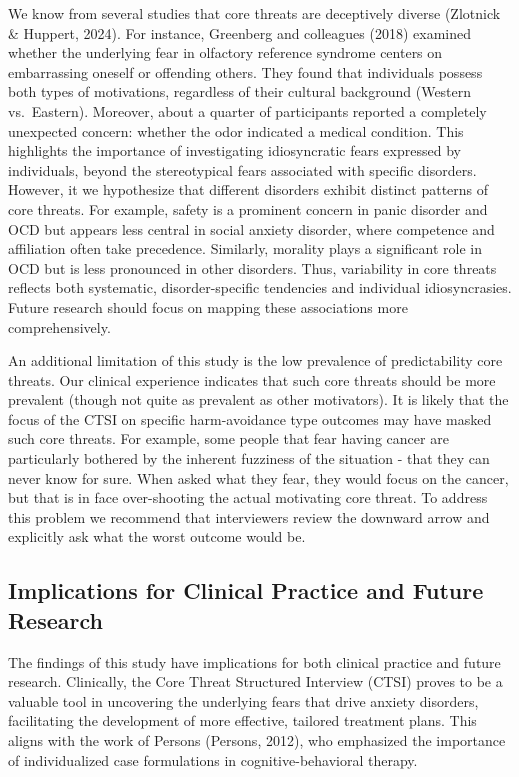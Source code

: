\documentclass[
  man,floatsintext]{apa7}
\begin{document}
We know from several studies that core threats are deceptively diverse (Zlotnick \& Huppert, 2024).
For instance, Greenberg and colleagues (2018) examined whether the underlying fear in olfactory reference syndrome centers on embarrassing oneself or offending others.
They found that individuals possess both types of motivations, regardless of their cultural background (Western vs.~Eastern).
Moreover, about a quarter of participants reported a completely unexpected concern: whether the odor indicated a medical condition.
This highlights the importance of investigating idiosyncratic fears expressed by individuals, beyond the stereotypical fears associated with specific disorders.
However, it we hypothesize that different disorders exhibit distinct patterns of core threats.
For example, safety is a prominent concern in panic disorder and OCD but appears less central in social anxiety disorder, where competence and affiliation often take precedence.
Similarly, morality plays a significant role in OCD but is less pronounced in other disorders.
Thus, variability in core threats reflects both systematic, disorder-specific tendencies and individual idiosyncrasies.
Future research should focus on mapping these associations more comprehensively.

An additional limitation of this study is the low prevalence of predictability core threats.
Our clinical experience indicates that such core threats should be more prevalent (though not quite as prevalent as other motivators).
It is likely that the focus of the CTSI on specific harm-avoidance type outcomes may have masked such core threats.
For example, some people that fear having cancer are particularly bothered by the inherent fuzziness of the situation - that they can never know for sure.
When asked what they fear, they would focus on the cancer, but that is in face over-shooting the actual motivating core threat.
To address this problem we recommend that interviewers review the downward arrow and explicitly ask what the worst outcome would be.

\subsection{Implications for Clinical Practice and Future Research}\label{implications-for-clinical-practice-and-future-research}

The findings of this study have implications for both clinical practice and future research.
Clinically, the Core Threat Structured Interview (CTSI) proves to be a valuable tool in uncovering the underlying fears that drive anxiety disorders, facilitating the development of more effective, tailored treatment plans.
This aligns with the work of Persons (Persons, 2012), who emphasized the importance of individualized case formulations in cognitive-behavioral therapy.
\end{document}
